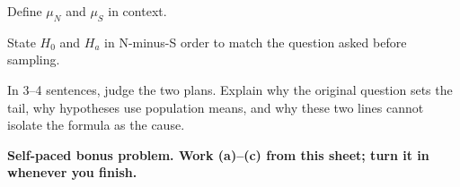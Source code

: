 \documentclass[14pt]{extarticle}
\begin{document}
\begin{description}[leftmargin=1.15in, labelwidth=1in, itemsep=2pt, topsep=2pt]
  \item[\dokbadge{1}~(a)] Define $\mu_N$ and $\mu_S$ in context.
  \item[\dokbadge{2}~(b)] State $H_0$ and $H_a$ in N-minus-S order to match the question asked before sampling.
  \item[\dokbadge{3}~(c)] In 3--4 sentences, judge the two plans. Explain why the original question sets the tail, why hypotheses use population means, and why these two lines cannot isolate the formula as the cause.
\end{description}

\vfill
\textbf{Self-paced bonus problem. Work (a)--(c) from this sheet; turn it in whenever you finish.}
\end{document}
